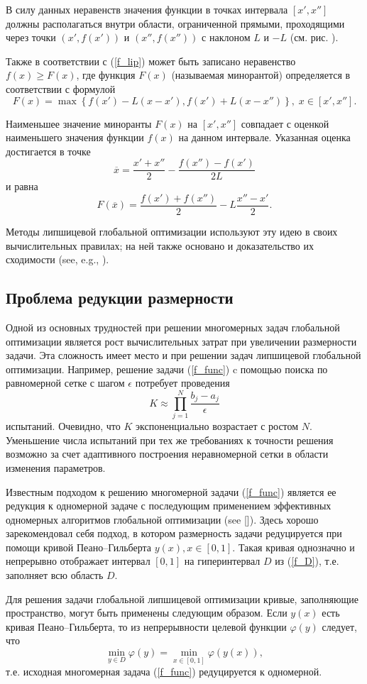 \documentclass[preprint,12pt]{elsarticle}
\begin{document}
В силу данных неравенств значения функции в точках интервала $[x', x'']$ должны располагаться внутри области, ограниченной прямыми, проходящими через точки $(x', f(x'))$ и $(x'', f(x''))$ с наклоном $L$ и $-L$ (см. рис. ).

Также в соответствии с (\ref{f_lip}) может быть записано неравенство $f(x) \geq F(x)$, где функция $F(x)$ (называемая минорантой) определяется в соответствии с формулой
\[
F(x) = \max\left\{f(x') - L(x-x'),f(x') + L(x-x'')\right\}, \; x\in [x', x''].
\] 

Наименьшее значение миноранты $F(x)$ на $[x', x'']$ совпадает с оценкой наименьшего значения функции $f(x)$ на данном интервале. Указанная оценка достигается в точке 
\[
\overline{x} = \frac{x'+x''}{2}-\frac{f(x'')-f(x')}{2L}
\] 
и равна
\[
F(\overline{x}) = \frac{f(x')+f(x'')}{2} -L \frac{x''-x'}{2}.
\]

Методы липшицевой глобальной оптимизации используют эту идею в своих вычислительных правилах; на ней также основано и доказательство их сходимости (see, e.g., ).

\subsection{Проблема редукции размерности} 

Одной из основных трудностей при решении многомерных задач глобальной оптимизации является рост вычислительных затрат при увеличении размерности задачи. Эта сложность имеет место и при решении задач липшицевой глобальной оптимизации.
Например, решение задачи (\ref{f_func}) c помощью поиска по равномерной сетке с шагом $\epsilon$ потребует проведения 
\[
K \approx \prod_{j=1}^N{\frac{b_j-a_j}{\epsilon}}
\]
испытаний. Очевидно, что $K$ экспоненциально возрастает с ростом $N$.
Уменьшение числа испытаний при тех же требованиях к точности решения возможно за счет адаптивного построения неравномерной сетки в области изменения параметров.

Известным подходом к решению многомерной задачи (\ref{f_func}) является ее редукция к одномерной задаче с последующим применением эффективных одномерных алгоритмов глобальной оптимизации (see []). Здесь хорошо зарекомендовал себя подход, в котором размерность задачи редуцируется при помощи кривой Пеано–Гильберта $y(x), x \in [0, 1]$.
Такая кривая однозначно и непрерывно отображает интервал $[0, 1]$ на гиперинтервал $D$ из (\ref{f_D}), т.е. заполняет всю область $D$.

Для решения задачи глобальной липшицевой оптимизации кривые, заполняющие пространство, могут быть применены следующим образом.
Если $y(x)$ есть кривая Пеано–Гильберта, то из непрерывности целевой функции $\varphi(y)$ следует, что
\[
\min_{y \in D } \varphi(y) = \min_{x \in [0,1] } \varphi(y(x)),
\]
т.е. исходная многомерная задача (\ref{f_func}) редуцируется к одномерной.
\end{document}
